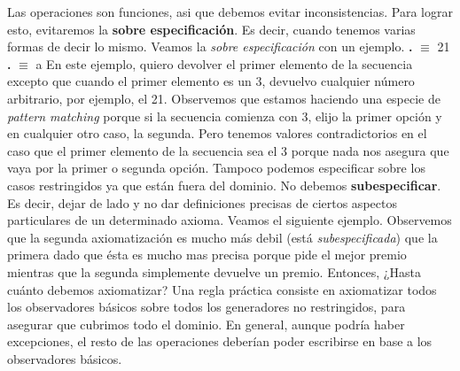 \documentclass[10pt,a4paper]{article}
\begin{document}
Las operaciones son funciones, asi que debemos evitar inconsistencias. Para lograr esto, evitaremos la \textbf{sobre especificación}. Es decir, cuando tenemos varias formas de decir lo mismo.
\newline
\newline
Veamos la \textit{sobre especificación} con un ejemplo.
\newline
\newline
\textbf{.}  $\equiv$ 21
\newline
\newline
\textbf{.}  $\equiv$ a
\newline
\newline
En este ejemplo, quiero devolver el primer elemento de la secuencia  excepto que cuando el primer elemento es un 3, devuelvo cualquier número arbitrario, por ejemplo, el 21. 
\newline
\newline
Observemos que estamos haciendo una especie de \textit{pattern matching} porque si la secuencia comienza con 3, elijo la primer opción y en cualquier otro caso, la segunda. Pero tenemos valores contradictorios en el caso que el primer elemento de la secuencia sea el 3 porque nada nos asegura que vaya por la primer o segunda opción.
\newline
\newline
Tampoco podemos especificar sobre los casos restringidos ya que están fuera del dominio.
\newline
\newline
No debemos \textbf{subespecificar}. Es decir, dejar de lado y no dar definiciones precisas de ciertos aspectos particulares de un determinado axioma. Veamos el siguiente ejemplo.
\newline
{}
\medskip
{}
\medskip
{}
\medskip
{}
\medskip
\medskip
Observemos que la segunda axiomatización es mucho más debil (está \textit{subespecificada}) que la primera dado que ésta es mucho mas precisa porque pide el mejor premio mientras que la segunda simplemente devuelve un premio. 
\newline
\newline
Entonces, ¿Hasta cuánto debemos axiomatizar?
\newline
\newline
Una regla práctica consiste en axiomatizar todos los observadores básicos sobre todos los generadores no restringidos, para asegurar que cubrimos todo el dominio.
\newline
\newline
En general, aunque podría haber excepciones, el resto de las operaciones deberían poder escribirse en base a los observadores básicos.
\end{document}
